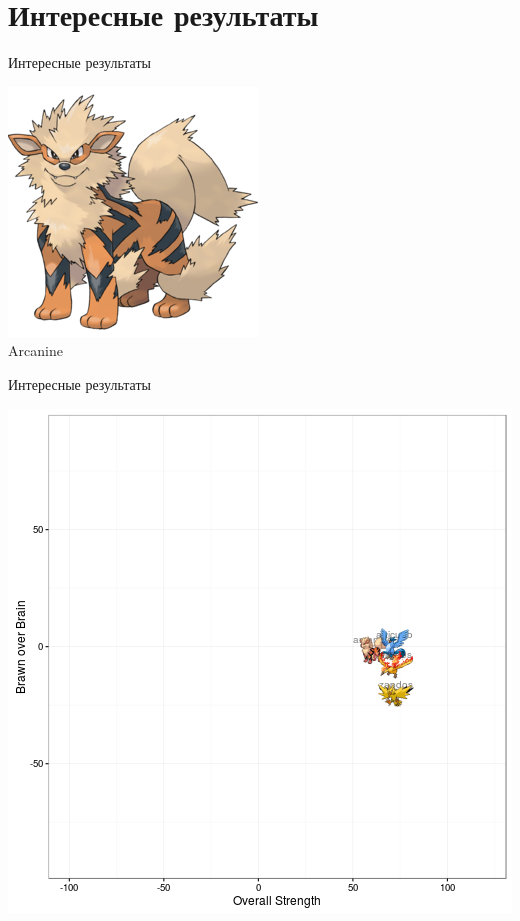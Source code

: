 \documentclass[10pt]{beamer}
\begin{document}
\section{Интересные результаты}

{
\begin{frame}{Интересные результаты}
	\begin{center}
	  	\includegraphics[keepaspectratio = true]{images/Arcanine}  \\
	  	Arcanine
	\end{center}
\end{frame}

\begin{frame}{Интересные результаты}
	\begin{center}
	  \includegraphics[width= \textwidth, height=0.8 \textheight, keepaspectratio = true]{images/legendary_arcanine}  
	\end{center}
\end{frame}
}
\end{document}
